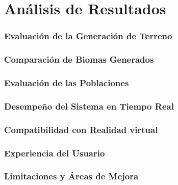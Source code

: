 \section{Análisis de Resultados}

    \subsubsection{Evaluación de la Generación de Terreno}

    \subsubsection{Comparación de Biomas Generados}

    \subsubsection{Evaluación de las Poblaciones}

    \subsubsection{Desempeño del Sistema en Tiempo Real}

    \subsubsection{Compatibilidad con Realidad virtual}

    \subsubsection{Experiencia del Usuario}

    \subsubsection{Limitaciones y Áreas de Mejora}
